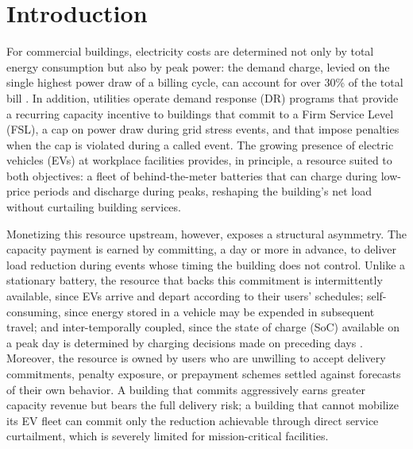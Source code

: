 \section{Introduction}
 
For commercial buildings, electricity costs are determined not only by
total energy consumption but also by peak power: the demand charge, levied
on the single highest power draw of a billing cycle, can account for over
30\% of the total bill \cite{}. In addition, utilities operate demand
response (DR) programs that provide a recurring capacity incentive to
buildings that commit to a Firm Service Level (FSL), a cap on power draw
during grid stress events, and that impose penalties when the cap is
violated during a called event. The growing presence of electric vehicles
(EVs) at workplace facilities provides, in principle, a resource suited to
both objectives: a fleet of behind-the-meter batteries that can charge
during low-price periods and discharge during peaks, reshaping the
building's net load without curtailing building services.
 
Monetizing this resource upstream, however, exposes a structural asymmetry.
The capacity payment is earned by committing, a day or more in advance, to
deliver load reduction during events whose timing the building does not
control. Unlike a stationary battery, the resource that backs this
commitment is intermittently available, since EVs arrive and depart
according to their users' schedules; self-consuming, since energy stored in
a vehicle may be expended in subsequent travel; and inter-temporally
coupled, since the state of charge (SoC) available on a peak day is
determined by charging decisions made on preceding days \cite{sen2026negotiations}.
Moreover, the resource is owned by users who are unwilling to accept
delivery commitments, penalty exposure, or prepayment schemes settled
against forecasts of their own behavior. A building that commits
aggressively earns greater capacity revenue but bears the full delivery
risk; a building that cannot mobilize its EV fleet can commit only the
reduction achievable through direct service curtailment, which is severely
limited for mission-critical facilities.
 
